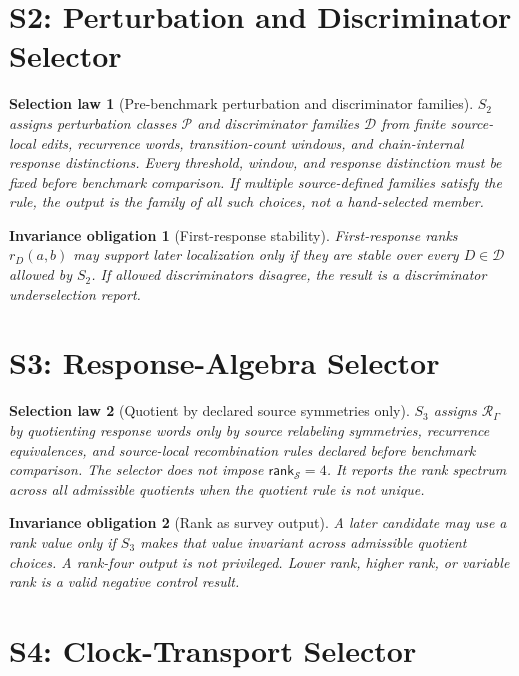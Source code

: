 \documentclass[11pt]{article}
\newcommand{\RespAlg}{\mathcal{R}_{\Gamma}}
\newcommand{\Rank}{\mathsf{rank}_{\mathcal{S}}}
\newtheorem{selectionlaw}{Selection law}
\newtheorem{obligation}{Invariance obligation}
\begin{document}
\section{S2: Perturbation and Discriminator Selector}

\begin{selectionlaw}[Pre-benchmark perturbation and discriminator families]
\(S_2\) assigns perturbation classes \(\mathcal{P}\) and discriminator
families \(\mathcal{D}\) from finite source-local edits, recurrence words,
transition-count windows, and chain-internal response distinctions. Every
threshold, window, and response distinction must be fixed before benchmark
comparison. If multiple source-defined families satisfy the rule, the output
is the family of all such choices, not a hand-selected member.
\end{selectionlaw}

\begin{obligation}[First-response stability]
First-response ranks \(r_D(a,b)\) may support later localization only if they
are stable over every \(D\in\mathcal{D}\) allowed by \(S_2\). If allowed
discriminators disagree, the result is a discriminator underselection report.
\end{obligation}

\section{S3: Response-Algebra Selector}

\begin{selectionlaw}[Quotient by declared source symmetries only]
\(S_3\) assigns \(\RespAlg\) by quotienting response words only by source
relabeling symmetries, recurrence equivalences, and source-local
recombination rules declared before benchmark comparison. The selector does
not impose \(\Rank=4\). It reports the rank spectrum across all admissible
quotients when the quotient rule is not unique.
\end{selectionlaw}

\begin{obligation}[Rank as survey output]
A later candidate may use a rank value only if \(S_3\) makes that value
invariant across admissible quotient choices. A rank-four output is not
privileged. Lower rank, higher rank, or variable rank is a valid negative
control result.
\end{obligation}

\section{S4: Clock-Transport Selector}
\end{document}
